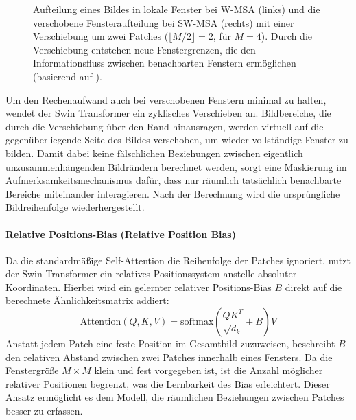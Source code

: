 \begin{figure}[H]
    \caption{Aufteilung eines Bildes in lokale Fenster bei W-MSA (links) und die verschobene Fensteraufteilung bei SW-MSA (rechts) mit einer Verschiebung um zwei Patches ($\lfloor M/2 \rfloor = 2$, für $M=4$). Durch die Verschiebung entstehen neue Fenstergrenzen, die den Informationsfluss zwischen benachbarten Fenstern ermöglichen (basierend auf \cite{swin2021}).}
    \label{fig:swin_shifted_windows}
\end{figure}

Um den Rechenaufwand auch bei verschobenen Fenstern minimal zu halten, wendet der Swin Transformer ein zyklisches Verschieben an. Bildbereiche, die durch die Verschiebung über den Rand hinausragen, werden virtuell auf die gegenüberliegende Seite des Bildes verschoben, um wieder vollständige Fenster zu bilden. Damit dabei keine fälschlichen Beziehungen zwischen eigentlich unzusammenhängenden Bildrändern berechnet werden, sorgt eine Maskierung im Aufmerksamkeitsmechanismus dafür, dass nur räumlich tatsächlich benachbarte Bereiche miteinander interagieren. Nach der Berechnung wird die ursprüngliche Bildreihenfolge wiederhergestellt.

\paragraph{Relative Positions-Bias (Relative Position Bias)}
Da die standardmäßige Self-Attention die Reihenfolge der Patches ignoriert, nutzt der Swin Transformer ein relatives Positionssystem anstelle absoluter Koordinaten. Hierbei wird ein gelernter relativer Positions-Bias $B$ direkt auf die berechnete Ähnlichkeitsmatrix addiert:
\begin{equation}
    \text{Attention}(Q, K, V) = \text{softmax}\left(\frac{QK^T}{\sqrt{d_k}} + B\right)V
\end{equation}
Anstatt jedem Patch eine feste Position im Gesamtbild zuzuweisen, beschreibt $B$ den relativen Abstand zwischen zwei Patches innerhalb eines Fensters. Da die Fenstergröße $M \times M$ klein und fest vorgegeben ist, ist die Anzahl möglicher relativer Positionen begrenzt, was die Lernbarkeit des Bias erleichtert. Dieser Ansatz ermöglicht es dem Modell, die räumlichen Beziehungen zwischen Patches besser zu erfassen.

